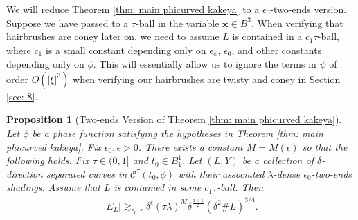 \documentclass[12pt]{amsart}
\newcommand{\x}{{\bf{x}}}
\numberwithin{equation}{section}
\newtheorem{proposition}[lemma]{Proposition}
\newcommand{\1}{\mathbbm{1}}
\renewcommand{\x}{\mathbf x}
\begin{document}
We will reduce Theorem \ref{thm: main phicurved kakeya} to a $\epsilon_0$-two-ends version. Suppose we have passed to a $\tau$-ball in the variable $\x \in B^3$. When verifying that hairbrushes are coney later on, we need to assume $L$ is contained in a $c_1 \tau$-ball, where $c_1$ is a small constant depending only on $\epsilon_\phi$, $\epsilon_0$, and other constants depending only on $\phi$.
This will essentially allow us to ignore the terms in $\psi$ of order $O(|\xi|^3)$ when verifying our hairbrushes are twisty and coney in Section \ref{sec: 8}.
\begin{proposition}[Two-ends Version of Theorem \ref{thm: main phicurved kakeya}]\label{prop: two ends version of thm}
    Let $\phi$ be a phase function satisfying the hypotheses in Theorem \ref{thm: main phicurved kakeya}. Fix $\epsilon_0, \epsilon > 0$. There exists a constant $M = M(\epsilon)$ so that the following holds. Fix $\tau \in (0,1]$ and $t_0 \in B_1^1$. Let $(L,Y)$ be a collection of $\delta$-direction separated curves in $\mathcal C^\tau(t_0, \phi)$ with their associated $\lambda$-dense $\epsilon_0$-two-ends shadings. Assume that $L$ is contained in some $c_1 \tau$-ball. Then 
    \begin{align}
        |E_L| \gtrsim_{\epsilon_0, \epsilon} \delta^\epsilon (\tau \lambda)^M \delta^{\frac{a + 1}{2}} (\delta^2 \# L)^{3/4}.
    \end{align}
\end{proposition}
\end{document}
